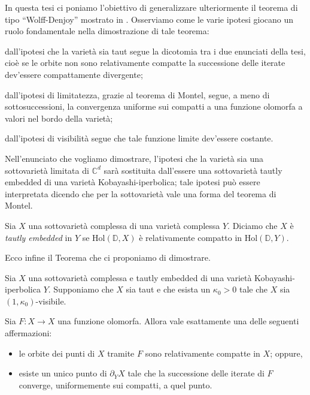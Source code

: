 In questa tesi ci poniamo l'obiettivo di generalizzare ulteriormente il teorema di tipo ``Wolff-Denjoy'' mostrato in \cite{CMS}. Osserviamo come le varie ipotesi giocano un ruolo fondamentale nella dimostrazione di tale teorema:
\begin{nlist}
    \item dall'ipotesi che la varietà sia taut segue la dicotomia tra i due enunciati della tesi, cioè se le orbite non sono relativamente compatte la successione delle iterate dev'essere compattamente divergente;
    \item dall'ipotesi di limitatezza, grazie al teorema di Montel, segue, a meno di sottosuccessioni, la convergenza uniforme sui compatti a una funzione olomorfa a valori nel bordo della varietà;
    \item dall'ipotesi di visibilità segue che tale funzione limite dev'essere costante.
\end{nlist}

Nell'enunciato che vogliamo dimostrare, l'ipotesi che la varietà sia una sottovarietà limitata di $\mathbb{C}^d$ sarà sostituita dall'essere una sottovarietà tautly embedded di una varietà Kobayashi-iperbolica; tale ipotesi può essere interpretata dicendo che per la sottovarietà vale una forma del teorema di Montel.

\begin{defn*}
    Sia $X$ una sottovarietà complessa di una varietà complessa $Y$. Diciamo che $X$ è \textit{tautly embedded} in $Y$ se $\text{Hol}(\mathbb{D},X)$ è relativamente compatto in $\text{Hol}(\mathbb{D},Y)$.
\end{defn*}

Ecco infine il Teorema che ci proponiamo di dimostrare.

\begin{thm*}
    Sia $X$ una sottovarietà complessa e tautly embedded di una varietà Kobayashi-iperbolica $Y$. Supponiamo che $X$ sia taut e che esista un $\kappa_0>0$ tale che $X$ sia $(1,\kappa_0)$-visibile.
    
    Sia $F:X \longrightarrow X$ una funzione olomorfa. Allora vale esattamente una delle seguenti affermazioni:
    \begin{itemize}
        \item le orbite dei punti di $X$ tramite $F$ sono relativamente compatte in $X$; oppure,
        \item esiste un unico punto di $\partial_YX$ tale che la successione delle iterate di $F$ converge, uniformemente sui compatti, a quel punto.
    \end{itemize}
\end{thm*}

